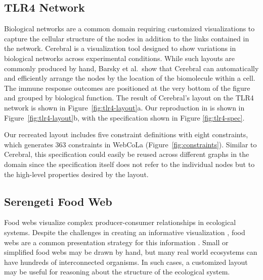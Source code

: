 \subsection{TLR4 Network}
\tlrfourSpec
Biological networks are a common domain requiring customized visualizations
to capture the cellular structure of the nodes in addition to the links
contained in the network. Cerebral \cite{barsky2008cerebral} is a visualization
tool designed to show variations in biological networks across experimental
conditions. While such layouts are commonly produced by hand, Barsky et al.\ show that 
Cerebral can automatically and efficiently arrange the nodes by the location
of the biomolecule within a cell. The immune response outcomes are positioned
at the very bottom of the figure and grouped by biological function. The result
of Cerebral's layout on the TLR4 network is shown in Figure~\ref{fig:tlr4-layout}a.
Our reproduction in \projectname is shown in Figure~\ref{fig:tlr4-layout}b,
with the specification shown in Figure \ref{fig:tlr4-spec}.

Our recreated layout includes five constraint definitions with eight \projectname
constraints, which generates $363$ constraints in WebCoLa (Figure~\ref{fig:constraints}).
Similar to Cerebral, this \projectname specification could easily be reused 
across different graphs in the domain since the specification itself does
not refer to the individual nodes but to the high-level properties desired
by the layout. 

\subsection{Serengeti Food Web}
\krugerLayout
\serengetiHybrid

Food webs visualize complex producer-consumer relationships in ecological
systems. Despite the challenges in creating an informative
visualization \cite{kearney2016blog}, food webs are a common presentation strategy for this information
\cite{hinke2004visualizing,harper2006dynamic,lavigne1996cod,baskerville2011spatial,yodzis1998local,cohen2003ecological,benson2016higher,kruger2017,kearney2013amplification,kearney2012coupling}.
Small or simplified food webs may be
drawn by hand, but many real world ecosystems can have hundreds of
interconnected organisms. In such cases, a customized layout may be useful
for reasoning about the structure of the ecological system.

